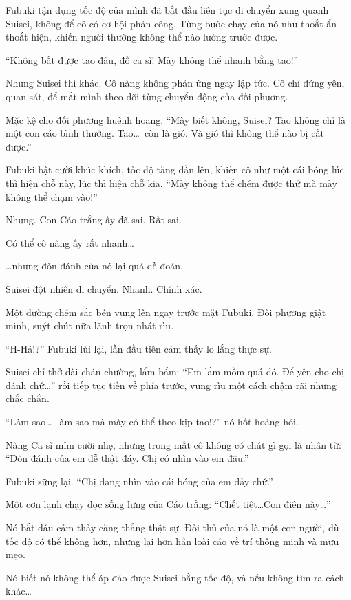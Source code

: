 \documentclass[../main.tex]{subfiles}
\begin{document}
Fubuki tận dụng tốc độ của mình đã bắt đầu liên tục di chuyển xung quanh Suisei, không để cô có cơ hội phản công. Từng bước chạy của nó như thoắt ẩn thoắt hiện, khiến người thường không thể nào lường trước được.

``Không bắt được tao đâu, đồ ca sĩ! Mày không thể nhanh bằng tao!''

Nhưng Suisei thì khác. Cô nàng không phản ứng ngay lập tức. Cô chỉ đứng yên, quan sát, để mắt mình theo dõi từng chuyển động của đối phương.

Mặc kệ cho đối phương huênh hoang. ``Mày biết không, Suisei? Tao không chỉ là một con cáo bình thường. Tao\dots\ còn là gió. Và gió thì không thể nào bị cắt được.''

Fubuki bật cười khúc khích, tốc độ tăng dần lên, khiến cô như một cái bóng lúc thì hiện chỗ này, lúc thì hiện chỗ kia. ``Mày không thể chém được thứ mà mày không thể chạm vào!''

Nhưng. Con Cáo trắng ấy đã sai. Rất sai.

Có thể cô nàng ấy rất nhanh\dots

\dots nhưng đòn đánh của nó lại quá dễ đoán.

Suisei đột nhiên di chuyển. Nhanh. Chính xác.

Một đường chém sắc bén vung lên ngay trước mặt Fubuki. Đối phương giật mình, suýt chút nữa lãnh trọn nhát rìu.

``H-Hả!?'' Fubuki lùi lại,  lần đầu tiên cảm thấy lo lắng thực sự.

Suisei chỉ thở dài chán chường, lẩm bẩm: ``Em lắm mồm quá đó. Để yên cho chị đánh chứ\dots'' rồi tiếp tục tiến về phía trước, vung rìu một cách chậm rãi nhưng chắc chắn.

``Làm sao\dots\ làm sao mà mày có thể theo kịp tao!?'' nó hốt hoảng hỏi.

Nàng Ca sĩ mỉm cười nhẹ, nhưng trong mắt cô không có chút gì gọi là nhân từ: ``Đòn đánh của em dễ thật đáy. Chị có nhìn vào em đâu.''

Fubuki sững lại. ``Chị đang nhìn vào cái bóng của em đấy chứ.''

Một cơn lạnh chạy dọc sống lưng của Cáo trắng: ``Chết tiệt\dots Con điên này\dots''

Nó bắt đầu cảm thấy căng thẳng thật sự. Đối thủ của nó là một con người, dù tốc độ có thể không hơn, nhưng lại hơn hẳn loài cáo về trí thông minh và mưu mẹo.

Nó biết nó không thể áp đảo được Suisei bằng tốc độ, và nếu không tìm ra cách khác\dots
\end{document}
